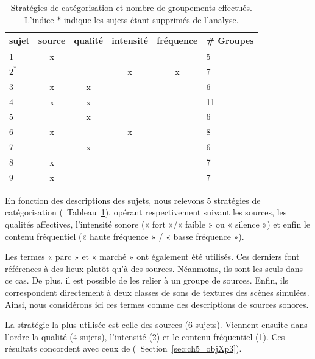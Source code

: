 \begin{table}[t]
\centering
\begin{tabular}{l|cccc|l} 
sujet    & source & qualité & intensité & fréquence & \# Groupes \\
\hline
    1    &   x    &         &        &           & 5  \\
    $2^*$&        &         &    x   &     x     & 7  \\
    3    &   x    &    x    &        &           & 6  \\
    4    &   x    &    x    &        &           & 11 \\        
    5    &        &    x    &        &           & 6  \\
    6    &   x    &         &    x   &           & 8  \\
    7    &        &    x    &        &           & 6  \\
    8    &   x    &         &        &           & 7  \\
    9    &   x    &         &        &           & 7  \\
\hline
\end{tabular}
\vspace{0.5mm}
\caption[Stratégies de catégorisation et nombre de groupements effectués.]{Stratégies de catégorisation et nombre de groupements effectués. L'indice $*$ indique les sujets étant supprimés de l'analyse.}
\label{tab:StratSate}
\end{table}

En fonction des descriptions des sujets, nous relevons 5 stratégies de catégorisation (\cf~Tableau~\ref{tab:StratSate}), opérant respectivement suivant les sources, les qualités affectives, l'intensité sonore (« fort »/« faible » ou « silence ») et enfin le contenu fréquentiel (« haute fréquence » / « basse fréquence »). 

Les termes « parc » et « marché » ont également été utilisés. Ces derniers font références à des lieux plutôt qu'à des sources. Néanmoins, ils sont les seuls dans ce cas. De plus, il est possible de les relier à un groupe de sources. Enfin, ils correspondent directement à deux classes de sons de textures des scènes simulées. Ainsi, nous considérons ici ces termes comme des descriptions de sources sonores.

La stratégie la plus utilisée est celle des sources (6 sujets). Viennent ensuite dans l'ordre la qualité (4 sujets), l'intensité (2) et le contenu fréquentiel (1). Ces résultats concordent avec ceux de \cite{maffiolo_caracterisation_1999} (\cf~Section~\ref{sec:ch5_objXp3}).

